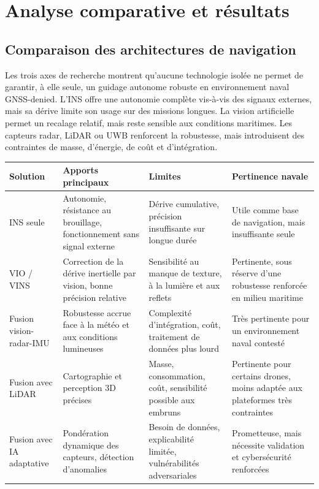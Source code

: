 \documentclass[12pt, a4paper, twoside, openright]{report}
\begin{document}
\chapter{Analyse comparative et résultats}\label{chap:analyse-resultats}

\section{Comparaison des architectures de navigation}
Les trois axes de recherche montrent qu’aucune technologie isolée ne permet de garantir, à elle seule, un guidage autonome robuste en environnement naval GNSS-denied. L’INS offre une autonomie complète vis-à-vis des signaux externes, mais sa dérive limite son usage sur des missions longues. La vision artificielle permet un recalage relatif, mais reste sensible aux conditions maritimes. Les capteurs radar, LiDAR ou UWB renforcent la robustesse, mais introduisent des contraintes de masse, d’énergie, de coût et d’intégration.

\begin{longtable}{p{3.2cm}p{3.5cm}p{3.5cm}p{3.8cm}}
\toprule
\textbf{Solution} & \textbf{Apports principaux} & \textbf{Limites} & \textbf{Pertinence navale} \\
\midrule
INS seule & Autonomie, résistance au brouillage, fonctionnement sans signal externe & Dérive cumulative, précision insuffisante sur longue durée & Utile comme base de navigation, mais insuffisante seule \\
VIO / VINS & Correction de la dérive inertielle par vision, bonne précision relative & Sensibilité au manque de texture, à la lumière et aux reflets & Pertinente, sous réserve d’une robustesse renforcée en milieu maritime \\
Fusion vision-radar-IMU & Robustesse accrue face à la météo et aux conditions lumineuses & Complexité d’intégration, coût, traitement de données plus lourd & Très pertinente pour un environnement naval contesté \\
Fusion avec LiDAR & Cartographie et perception 3D précises & Masse, consommation, coût, sensibilité possible aux embruns & Pertinente pour certains drones, moins adaptée aux plateformes très contraintes \\
Fusion avec IA adaptative & Pondération dynamique des capteurs, détection d’anomalies & Besoin de données, explicabilité limitée, vulnérabilités adversariales & Prometteuse, mais nécessite validation et cybersécurité renforcées \\
\bottomrule
\end{longtable}
\end{document}
